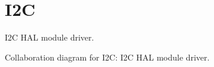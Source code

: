 \hypertarget{group__I2C}{}\section{I2C}
\label{group__I2C}


I2C H\+AL module driver.  


Collaboration diagram for I2C\+:
I2C H\+AL module driver. 

